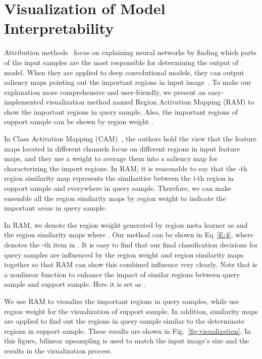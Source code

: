 \documentclass[letterpaper]{article}
\begin{document}
\section{Visualization of Model Interpretability}\label{section: Vis}
Attribution methods~\cite{petsiuk2018rise,zhou2016learning} focus on explaining neural networks by finding which parts of the input samples are the most responsible for determining the output of model. When they are applied to deep convolutional models, they can output saliency maps pointing out the important regions in input image~\cite{fong2019pertubation}. 
To make our explanation more comprehensive and user-friendly, we present an easy-implemented visualization method named Region Activation Mapping (RAM) to show the important regions in query sample. Also, the important regions of support sample can be shown by region weight .

In Class Activation Mapping (CAM)~\cite{zhou2016learning}, the authors hold the view that the feature maps located in different channels focus on different regions in input feature maps, and they use a weight to average them into a saliency map for characterizing the import regions. In RAM, it is reasonable to say that the -th region similarity map  represents the similarities between the i-th region in support sample and everywhere in query sample. Therefore, we can make ensemble all the region similarity maps by region weight to indicate the important areas in query sample.


In RAM, we denote the region weight generated by region meta learner as  and the region similarity maps  where . Our method can be shown in Eq~\ref{E:4}, where  denotes the -th item in . It is easy to find that our final classification decisions for query samples are influenced by the region weight and region similarity maps together so that RAM can show this combined influence very clearly. Note that  is a nonlinear function to enhance the impact of similar regions between query sample and support sample. Here it is set as .      

We use RAM to visualize the important regions in query samples, while use region weight for the visualization of support sample. In addition, similarity maps are applied to find out the regions in query sample similar to the determinate regions in support sample. These results are shown in Fig.~\ref{fig:visualization}. In this figure, bilinear upsampling is used to match the input image's size and the results in the visualization process. 
\end{document}
